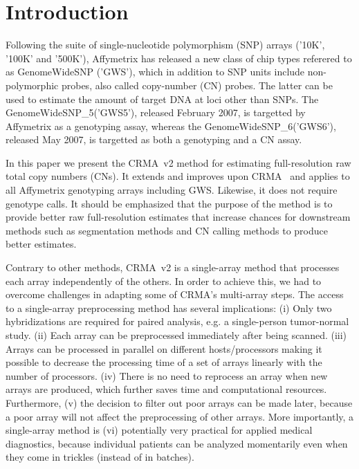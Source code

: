 \documentclass{bioinfo}
\newcommand{\GWS}{GWS\xspace}
\newcommand{\GWSFive}{GWS5\xspace}
\newcommand{\GWSSix}{GWS6\xspace}
\newcommand{\GWSFivef}{GenomeWideSNP\_5\xspace}
\newcommand{\GWSSixf}{GenomeWideSNP\_6\xspace}
\begin{document}
\section{Introduction}
\label{secBackground}
Following the suite of single-nucleotide polymorphism (SNP) arrays ('10K', '100K' and '500K'), Affymetrix has released a new class of chip types referered to as GenomeWideSNP ('GWS'), which in addition to SNP units include non-polymorphic probes, also called copy-number (CN) probes.  The latter can be used to estimate the amount of target DNA at loci other than SNPs.  The \GWSFivef ('\GWSFive'), released February 2007, is targetted by Affymetrix as a genotyping assay, whereas the \GWSSixf ('\GWSSix'), released May 2007, is targetted as both a genotyping and a CN assay.

In this paper we present the CRMA~v2 method for estimating full-resolution raw total copy numbers (CNs).  It extends and improves upon CRMA~\citep{BengtssonH_etal_2008a} and applies to all Affymetrix genotyping arrays including \GWS. Likewise, it does not require genotype calls.  
It should be emphasized that the purpose of the method is to provide better raw full-resolution estimates that increase chances for downstream methods such as segmentation methods and CN calling methods to produce better estimates.

Contrary to other methods, CRMA~v2 is a single-array method that processes each array independently of the others.  In order to achieve this, we had to overcome challenges in adapting some of CRMA's multi-array steps.
The access to a single-array preprocessing method has several implications: (i) Only two hybridizations are required for paired analysis, e.g. a single-person tumor-normal study. (ii) Each array can be preprocessed immediately after being scanned.  (iii) Arrays can be processed in parallel on different hosts/processors making it possible to decrease the processing time of a set of arrays linearly with the number of processors.  (iv) There is no need to reprocess an array when new arrays are produced, which further saves time and computational resources.   Furthermore, (v) the decision to filter out poor arrays can be made later, because a poor array will not affect the preprocessing of other arrays. %
More importantly, a single-array method is (vi) potentially very practical for applied medical diagnostics, because individual patients can be analyzed momentarily even when they come in trickles (instead of in batches).
\end{document}

